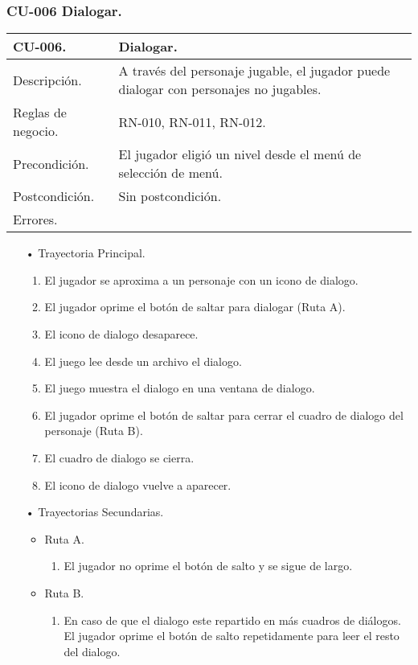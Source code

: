 \subsubsection{CU-006 Dialogar.} \label{CU:06}
\begin{longtable}[c]{ | m{5cm} | m{10cm}|} 
		\hline
		\rowcolor{cyan}CU-006. & Dialogar.\\ 
		\hline
		Descripción. & A través del personaje jugable, el jugador puede dialogar con personajes no jugables.\\ 
		\hline
		Reglas de negocio. & RN-010, RN-011, RN-012.\\ 
		\hline
		Precondición. & El jugador eligió un nivel desde el menú de selección de menú.\\
		\hline
		Postcondición. & Sin postcondición.\\
		\hline
		Errores. & \\
		\hline
\end{longtable}
\begin{itemize}
	\item[•] Trayectoria Principal.
		\begin{enumerate}
			\item El jugador se aproxima a un personaje con un icono de dialogo.
			\item El jugador oprime el botón de saltar para dialogar (Ruta A).
			\item El icono de dialogo desaparece.
			\item El juego lee desde un archivo el dialogo.
			\item El juego muestra el dialogo en una ventana de dialogo.
			\item El jugador oprime el botón de saltar para cerrar el cuadro de dialogo del personaje (Ruta B).
			\item El cuadro de dialogo se cierra.
			\item El icono de dialogo vuelve a aparecer.

		\end{enumerate}
	\item[•] Trayectorias Secundarias.
		\begin{itemize}
			\item Ruta A.
				\begin{enumerate}
					\item El jugador no oprime el botón de salto y se sigue de largo.
				\end{enumerate}
			\item Ruta B.
				\begin{enumerate}
					\item En caso de que el dialogo este repartido en más cuadros de diálogos. El jugador oprime el botón de salto repetidamente para leer el resto del dialogo.
				\end{enumerate}
		\end{itemize}
\end{itemize}